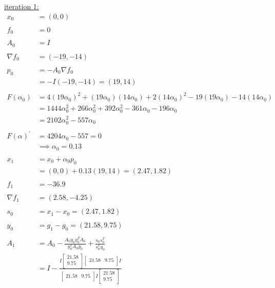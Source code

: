\documentclass{article}
\begin{document}
\noindent
\underline{iteration 1:}
\begin{align*}
  x_0 &= (0, 0) &&\\
  &&\\
  f_0 &= 0 &&\\
  &&\\
  A_0 &= I &&\\
  &&\\
  \nabla f_0 &= (-19, -14) &&\\
  &&\\
  p_0 &= -A_0 \nabla f_0 &&\\
  &= -I (-19, -14) = (19, 14) &&\\
  &&\\
  F(\alpha_0) 
  &= 4(19 \alpha_0)^2  + (19 \alpha_0)(14 \alpha_0) + 2(14 \alpha_0)^2 - 19(19 \alpha_0) - 14(14 \alpha_0) &&\\
  &= 1444 \alpha_0^2 + 266 \alpha_0^2 + 392 \alpha_0^2 - 361 \alpha_0 - 196 \alpha_0 &&\\
  &= 2102 \alpha_0^2 -557 \alpha_0 &&\\
  &&\\
  F(\alpha)^\prime &= 4204 \alpha_0 - 557 = 0 &&\\
  &\implies \alpha_0 = 0.13 &&\\
  &&\\
  x_{1} &= x_0 + \alpha_0 p_0 &&\\
  &= (0, 0) + 0.13 (19, 14) = (2.47, 1.82) &&\\
  &&\\
  f_1 &= -36.9 &&\\
  &&\\
  \nabla f_1 &=  (2.58, -4.25) &&\\
  &&\\
  s_0 &= x_1 - x_0 = (2.47, 1.82) &&\\
  &&\\
  y_0 &= g_1 - g_0 = (21.58, 9.75) &&\\
  &&\\
  A_1
  &= A_0
  - \frac{A_0 y_0 y_0^T A_0}{y_0^T A_0 y_0}  
  + \frac{s_0 s_0^T}{s_0^T y_0} &&\\
  &= I
  - \frac{I \begin{bmatrix} 21.58 \\ 9.75 \\ \end{bmatrix} \begin{bmatrix} 21.58 & 9.75 \\ \end{bmatrix} I}{\begin{bmatrix} 21.58 & 9.75 \\ \end{bmatrix} I \begin{bmatrix} 21.58 \\ 9.75 \\ \end{bmatrix}}  

\end{align*}
\end{document}
